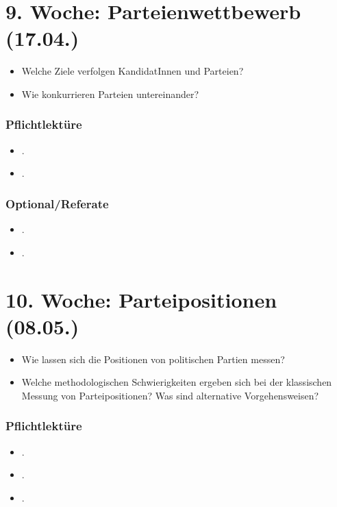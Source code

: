 \documentclass[abstract=on,parskip=full,headings=standardclasses,fontsize=11pt,paper=a4]{scrartcl}
\begin{document}
\section{9. Woche: Parteienwettbewerb (17.04.)}

\begin{itemize}
\renewcommand\labelitemi{--}
\item Welche Ziele verfolgen KandidatInnen und Parteien?
\item Wie konkurrieren Parteien untereinander? 
\end{itemize}

\subsubsection*{Pflichtlektüre}
\begin{itemize}
\item {}.
\item {}.
\end{itemize}

\subsubsection*{Optional/Referate}
\begin{itemize}
\item {}.
\item {}.
\end{itemize}


\section{10. Woche: Parteipositionen (08.05.)}


\begin{itemize}
\renewcommand\labelitemi{--}
\item Wie lassen sich die Positionen von politischen Partien messen?
\item Welche methodologischen Schwierigkeiten ergeben sich bei der klassischen Messung von Parteipositionen? Was sind alternative Vorgehensweisen?
\end{itemize}

\subsubsection*{Pflichtlektüre}
\begin{itemize}
\item {}.
\item {}.
\item {}.
\end{itemize}
\end{document}
